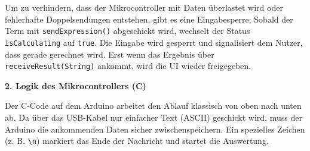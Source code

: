 \documentclass[12pt, a4paper]{article}
\begin{document}
Um zu verhindern, dass der Mikrocontroller mit Daten überlastet wird oder fehlerhafte Doppelsendungen entstehen, gibt es eine Eingabesperre: Sobald der Term mit \texttt{sendExpression()} abgeschickt wird, wechselt der Status \texttt{isCalculating} auf \texttt{true}. Die Eingabe wird gesperrt und signalisiert dem Nutzer, dass gerade gerechnet wird. Erst wenn das Ergebnis über \texttt{receiveResult(String)} ankommt, wird die UI wieder freigegeben.

\vspace{0.3cm}
\begin{center}
\end{center}

\vspace{0.5cm}

\textbf{2. Logik des Mikrocontrollers (C)}

Der C-Code auf dem Arduino arbeitet den Ablauf klassisch von oben nach unten ab. Da über das USB-Kabel nur einfacher Text (ASCII) geschickt wird, muss der Arduino die ankommenden Daten sicher zwischenspeichern. Ein spezielles Zeichen (z. B. \texttt{\textbackslash n}) markiert das Ende der Nachricht und startet die Auswertung.
\end{document}
